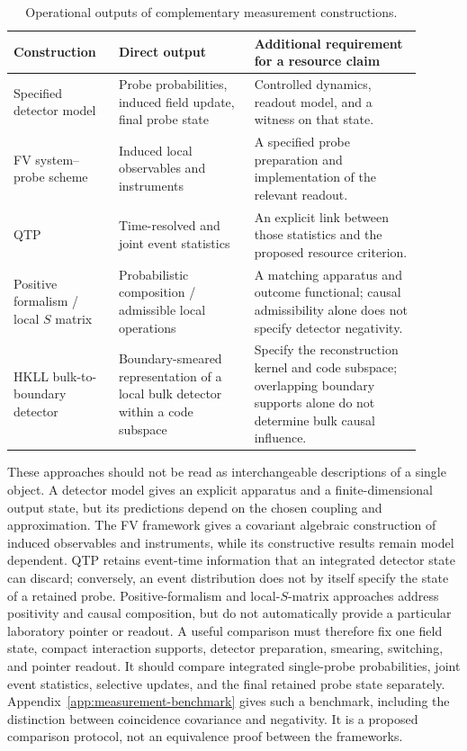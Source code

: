 \documentclass[pdflatex,sn-mathphys-num]{sn-jnl}
\begin{document}
\begin{table}[htbp]
\centering\small
\caption{Operational outputs of complementary measurement constructions.}
\label{tab:causal-measurements}
\begin{tabular}{L{0.23\linewidth}L{0.30\linewidth}L{0.37\linewidth}}
\toprule
Construction & Direct output & Additional requirement for a resource claim\\
\midrule
Specified detector model \cite{PoloGomez2022} & Probe probabilities, induced field update, final probe state & Controlled dynamics, readout model, and a witness on that state.\\
FV system--probe scheme \cite{FewsterVerch2020} & Induced local observables and instruments & A specified probe preparation and implementation of the relevant readout.\\
QTP \cite{AnastopoulosHuSavvidou2023} & Time-resolved and joint event statistics & An explicit link between those statistics and the proposed resource criterion.\\
Positive formalism / local $S$ matrix \cite{OecklZampeli2026,Simmons2026} & Probabilistic composition / admissible local operations & A matching apparatus and outcome functional; causal admissibility alone does not specify detector negativity.\\
HKLL bulk-to-boundary detector \cite{CaminitiMyersWurtz2026} & Boundary-smeared representation of a local bulk detector within a code subspace & Specify the reconstruction kernel and code subspace; overlapping boundary supports alone do not determine bulk causal influence.\\
\bottomrule
\end{tabular}
\end{table}

These approaches should not be read as interchangeable descriptions of a single object. A detector model gives an explicit apparatus and a finite-dimensional output state, but its predictions depend on the chosen coupling and approximation. The FV framework gives a covariant algebraic construction of induced observables and instruments, while its constructive results remain model dependent. QTP retains event-time information that an integrated detector state can discard; conversely, an event distribution does not by itself specify the state of a retained probe. Positive-formalism and local-$S$-matrix approaches address positivity and causal composition, but do not automatically provide a particular laboratory pointer or readout. A useful comparison must therefore fix one field state, compact interaction supports, detector preparation, smearing, switching, and pointer readout. It should compare integrated single-probe probabilities, joint event statistics, selective updates, and the final retained probe state separately. Appendix~\ref{app:measurement-benchmark} gives such a benchmark, including the distinction between coincidence covariance and negativity. It is a proposed comparison protocol, not an equivalence proof between the frameworks.
\end{document}
